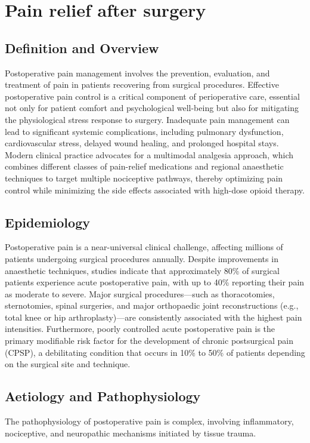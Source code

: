 \chapter{Pain relief after surgery}

\section*{Definition and Overview}
Postoperative pain management involves the prevention, evaluation, and treatment of pain in patients recovering from surgical procedures. Effective postoperative pain control is a critical component of perioperative care, essential not only for patient comfort and psychological well-being but also for mitigating the physiological stress response to surgery. Inadequate pain management can lead to significant systemic complications, including pulmonary dysfunction, cardiovascular stress, delayed wound healing, and prolonged hospital stays. Modern clinical practice advocates for a multimodal analgesia approach, which combines different classes of pain-relief medications and regional anaesthetic techniques to target multiple nociceptive pathways, thereby optimizing pain control while minimizing the side effects associated with high-dose opioid therapy.

\section*{Epidemiology}
Postoperative pain is a near-universal clinical challenge, affecting millions of patients undergoing surgical procedures annually. Despite improvements in anaesthetic techniques, studies indicate that approximately 80\% of surgical patients experience acute postoperative pain, with up to 40\% reporting their pain as moderate to severe. Major surgical procedures—such as thoracotomies, sternotomies, spinal surgeries, and major orthopaedic joint reconstructions (e.g., total knee or hip arthroplasty)—are consistently associated with the highest pain intensities. Furthermore, poorly controlled acute postoperative pain is the primary modifiable risk factor for the development of chronic postsurgical pain (CPSP), a debilitating condition that occurs in 10\% to 50\% of patients depending on the surgical site and technique.

\section*{Aetiology and Pathophysiology}
The pathophysiology of postoperative pain is complex, involving inflammatory, nociceptive, and neuropathic mechanisms initiated by tissue trauma.

